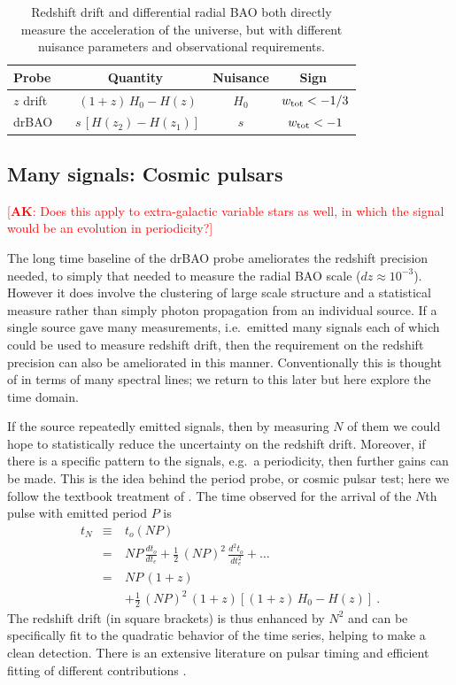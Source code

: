 \documentclass[preprint2, 10pt]{aastex}
\newcommand{\bea}{\begin{eqnarray}}
\newcommand{\eea}{\end{eqnarray}}
\newcommand{\alex}[1]{\textcolor{red}{[{\bf AK}: #1]}}
\begin{document}
\begin{table}[!htb]
\footnotesize
\begin{tabular}{l|ccc} 
Probe \ & \ Quantity \ & Nuisance & \ Sign \ \\ 
\hline 
$z$ drift &$(1+z)\,H_0-H(z)$ & $H_0$ & $w_{\rm tot}<-1/3$ \\ 
drBAO & $s\,[H(z_2)-H(z_1)]$ & $s$ & $w_{\rm tot}<-1$ \\ 
\end{tabular} 
\caption{Redshift drift and differential radial BAO both 
directly measure the acceleration of the universe, but with different 
nuisance parameters and observational requirements. 
}
\label{tab:drbao}
\end{table} 


\subsection{Many signals: Cosmic pulsars} 
\alex{Does this apply to extra-galactic variable stars as well, in which the signal would be
an evolution in periodicity?}

The long time baseline of the drBAO probe ameliorates the redshift 
precision needed, to simply that needed to measure the radial BAO scale 
($dz\approx10^{-3}$).  However it does involve the clustering of large scale 
structure and a statistical measure rather than simply photon propagation 
from an individual source.  If a single source gave many measurements, 
i.e.\ emitted many signals each of which could be used to measure redshift 
drift, then the requirement on the redshift precision can also be 
ameliorated in this manner.  
Conventionally this is thought of in terms of many spectral lines; we 
return to this later but here explore the time domain. 

If the source repeatedly emitted signals, then by measuring $N$ of them 
we could hope to statistically reduce the uncertainty on the redshift drift.  
Moreover, if there 
is a specific pattern to the signals, e.g.\ a periodicity, then further 
gains can be made.  This is the idea behind the period probe, or cosmic 
pulsar test; here we follow the textbook treatment of \citet{fpoc}.  The time 
observed for the arrival of the $N$th pulse with emitted period $P$ is 
\bea 
t_N&\equiv& t_o(NP)\nonumber\\ 
&=&NP\,\frac{dt_o}{dt_e}+\frac{1}{2}\,(NP)^2\,\frac{d^2t_o}{dt_e^2}+\dots\\ 
&=&NP\,(1+z)\nonumber\\ 
&\quad&+\frac{1}{2}\,(NP)^2\,(1+z)\left[(1+z)\,H_0-H(z)\right]\ . 
\eea 
The redshift drift (in square brackets) is thus enhanced by $N^2$ and 
can be specifically fit to the quadratic behavior of the time series, 
helping to make a clean detection.  There is an extensive literature on 
pulsar timing and efficient fitting of different contributions 
\citep{pulsars}. 
\end{document}
